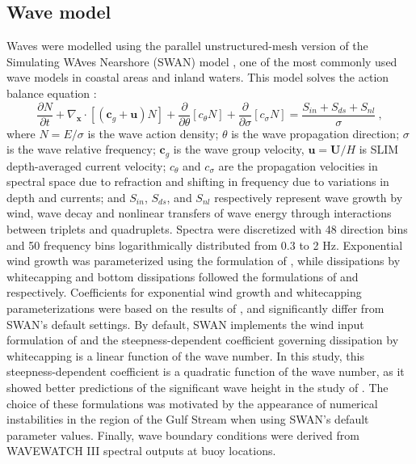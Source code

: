 \documentclass[11pt,a4paper]{article}
\begin{document}
\subsection{Wave model}
Waves were modelled using the parallel unstructured-mesh version of the Simulating WAves Nearshore (SWAN) model \citep{booij1999third}, one of the most commonly used wave models in coastal areas and inland waters. This model solves the action balance equation \citep{mei1989applied}:
\begin{equation}
    \dfrac{\partial N}{\partial t} + \nabla_\mathbf{x}\cdot[(\mathbf{c}_g+\mathbf{u})N] + \dfrac{\partial }{\partial \theta}[c_\theta N] + \dfrac{\partial}{\partial \sigma}[c_\sigma N] = \dfrac{S_{in}+S_{ds}+S_{nl}}{\sigma}~, \label{eq:swan}
\end{equation}
where $N=E/\sigma$ is the wave action density; $\theta$ is the wave propagation direction; $\sigma$ is the wave relative frequency; $\mathbf{c}_g$ is the wave group velocity, $\mathbf{u}=\mathbf{U}/H$ is SLIM depth-averaged current velocity; $c_\theta$ and $c_\sigma$ are the propagation velocities in spectral space due to refraction and shifting in frequency due to variations in depth and currents; and $S_{in}$, $S_{ds}$, and $S_{nl}$ respectively represent wave growth by wind, wave decay and nonlinear transfers of wave energy through interactions between triplets and quadruplets. Spectra were discretized with 48 direction bins and 50 frequency bins logarithmically distributed from 0.3 to 2 Hz. Exponential wind growth was parameterized using the formulation of \cite{janssen1991quasi}, while dissipations by whitecapping and bottom dissipations followed the formulations of \cite{komen1984existence} and \cite{madsen1989spectral} respectively. Coefficients for exponential wind growth and whitecapping parameterizations were based on the results of \cite{siadatmousavi2011evaluation}, and significantly differ from SWAN's default settings. By default, SWAN implements the wind input formulation of \cite{komen1984existence} and the steepness-dependent coefficient governing dissipation by whitecapping is a linear function of the wave number. In this study, this steepness-dependent coefficient is a quadratic function of the wave number, as it showed better predictions of the significant wave height in the study of \cite{siadatmousavi2011evaluation}. The choice of these formulations was motivated by the appearance of numerical instabilities in the region of the Gulf Stream when using SWAN's default parameter values. Finally, wave boundary conditions were derived from WAVEWATCH III \citep{tolman2009user} spectral outputs at buoy locations. 
\end{document}

